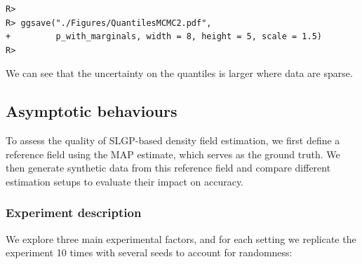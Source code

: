 \documentclass[
]{article}
\begin{document}
\begin{verbatim}
R> 
R> ggsave("./Figures/QuantilesMCMC2.pdf",
+         p_with_marginals, width = 8, height = 5, scale = 1.5)
R> 
\end{verbatim}

We can see that the uncertainty on the quantiles is larger where data are sparse.

\subsection{Asymptotic behaviours}\label{asymptotic-behaviours}

To assess the quality of SLGP-based density field estimation, we first define a reference field using the MAP estimate, which serves as the ground truth. We then generate synthetic data from this reference field and compare different estimation setups to evaluate their impact on accuracy.

\subsubsection{Experiment description}\label{experiment-description}

We explore three main experimental factors, and for each setting we replicate the experiment 10 times with several seeds to account for randomness:
\end{document}

